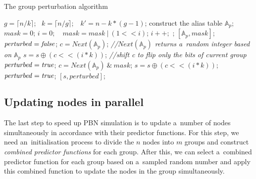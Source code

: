 \documentclass[runningheads,a4paper]{llncs}
\begin{document}
\begin{algorithm}[!t]
\caption{The group perturbation algorithm}
\label{alg:per}
\begin{algorithmic}[1]
    \State $g=\lceil n/k \rceil$; ~$k=\lceil n/g \rceil$;~~$k'=n-k*(g-1)$;
    \label{alg-line:perturbe_k}
    \State construct the alias table $\mathbb{A}_p$; $mask=0$; $i=0$;
    \Repeat~ $mask=mask~|~(1<\!\!\!<i)$; $i++;$ ;
    \State \Return $[\mathbb{A}_p, mask]$;
\EndProcedure
{}
    \State ${\it perturbed=false}$;
    \State $c=Next(\mathbb{A}_p)$; \hfill{\it //$Next(\mathbb{A}_p)$ returns a~random integer
      based on $\mathbb{A}_p$}
    \State $s=s\oplus(c<\!\!\!<(i*k))$; \hfill{\it //shift c to flip only the bits of
      current group}
    \label{alg-line:perturbe}
    \State ${\it perturbed=true}$;
    \EndIf
    \EndFor
	\State $c=Next(\mathbb{A}_p)\ \&\ mask$;
    \State $s=s\oplus(c<\!\!\!<(i*k))$; ~~${\it perturbed=true}$;
    \EndIf
    \State \Return $[s, perturbed]$;
\EndProcedure
\end{algorithmic}
\end{algorithm}

\subsection{Updating nodes in parallel}
\label{ssec:cpf}
The last step to speed up PBN simulation is to update a~number of nodes simultaneously in
accordance with their predictor functions.
For this step, we need an~initialisation process to divide the $n$ nodes
into $m$ groups and construct \emph{combined predictor functions} for each group.
After this, we can select a~combined predictor function for each group
based on a~sampled random number and apply this combined function to update the nodes in
the group simultaneously.
\end{document}
